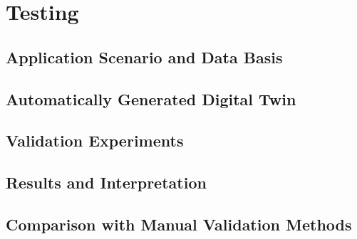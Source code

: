 \chapter{Testing}
\label{chap:case-study}

\section{Application Scenario and Data Basis}

\section{Automatically Generated Digital Twin}

\section{Validation Experiments}

\section{Results and Interpretation}

\section{Comparison with Manual Validation Methods}
